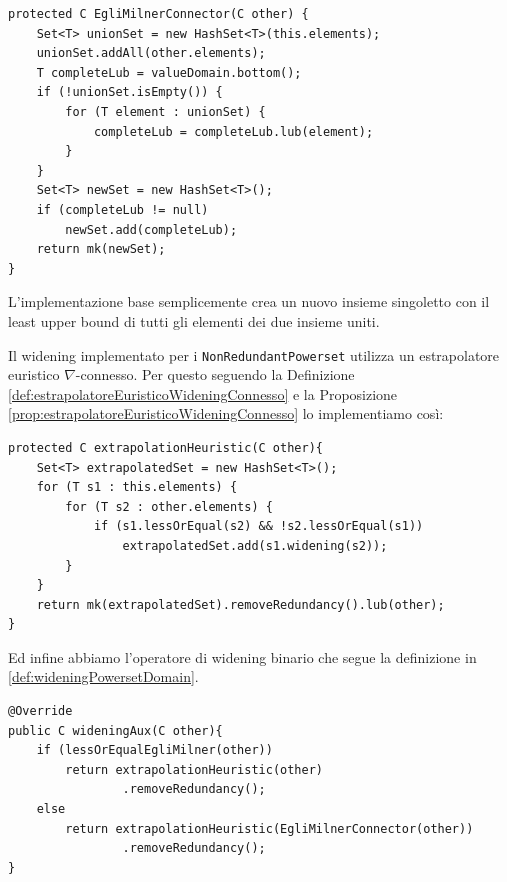 \begin{lstlisting}[belowskip=-1.1 \baselineskip]
protected C EgliMilnerConnector(C other) {
    Set<T> unionSet = new HashSet<T>(this.elements);
    unionSet.addAll(other.elements);
    T completeLub = valueDomain.bottom();
    if (!unionSet.isEmpty()) {
        for (T element : unionSet) {
            completeLub = completeLub.lub(element);
        }
    }
    Set<T> newSet = new HashSet<T>();
    if (completeLub != null)
        newSet.add(completeLub);
    return mk(newSet);
}
\end{lstlisting}
L'implementazione base semplicemente crea un nuovo insieme singoletto con il least upper bound di tutti gli elementi dei due insieme uniti. 

\noindent Il widening implementato per i \texttt{NonRedundantPowerset} utilizza un estrapolatore euristico \(\nabla\)-connesso. Per questo seguendo la Definizione \ref{def:estrapolatoreEuristicoWideningConnesso} e la Proposizione \ref{prop:estrapolatoreEuristicoWideningConnesso} lo implementiamo così: 
\begin{lstlisting}[belowskip=-1.1 \baselineskip]
protected C extrapolationHeuristic(C other){
    Set<T> extrapolatedSet = new HashSet<T>();
    for (T s1 : this.elements) {
        for (T s2 : other.elements) {
            if (s1.lessOrEqual(s2) && !s2.lessOrEqual(s1))
                extrapolatedSet.add(s1.widening(s2));
        }
    }
    return mk(extrapolatedSet).removeRedundancy().lub(other);
}
\end{lstlisting}
Ed infine abbiamo l'operatore di widening binario che segue la definizione in \ref{def:wideningPowersetDomain}. 
\begin{lstlisting}[belowskip=-1.1 \baselineskip]
@Override
public C wideningAux(C other){
    if (lessOrEqualEgliMilner(other))
        return extrapolationHeuristic(other)
                .removeRedundancy();
    else
        return extrapolationHeuristic(EgliMilnerConnector(other))
                .removeRedundancy();
}
\end{lstlisting}

